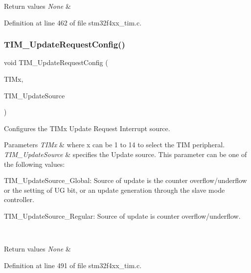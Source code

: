 \begin{DoxyRetVals}{Return values}
{\em None} & \\
\hline
\end{DoxyRetVals}


Definition at line 462 of file stm32f4xx\+\_\+tim.\+c.

\mbox{\label{group___t_i_m___group1_ga1d7a8f952e209de142499e67a653fc1f}} 
\subsubsection{\texorpdfstring{T\+I\+M\+\_\+\+Update\+Request\+Config()}{TIM\_UpdateRequestConfig()}}
{\footnotesize\ttfamily void T\+I\+M\+\_\+\+Update\+Request\+Config (\begin{DoxyParamCaption}\item[{\hyperlink{struct_t_i_m___type_def}{T\+I\+M\+\_\+\+Type\+Def} $\ast$}]{T\+I\+Mx,  }\item[{uint16\+\_\+t}]{T\+I\+M\+\_\+\+Update\+Source }\end{DoxyParamCaption})}



Configures the T\+I\+Mx Update Request Interrupt source. 


\begin{DoxyParams}{Parameters}
{\em T\+I\+Mx} & where x can be 1 to 14 to select the T\+IM peripheral. \\
\hline
{\em T\+I\+M\+\_\+\+Update\+Source} & specifies the Update source. This parameter can be one of the following values\+: \begin{DoxyItemize}
\item T\+I\+M\+\_\+\+Update\+Source\+\_\+\+Global\+: Source of update is the counter overflow/underflow or the setting of UG bit, or an update generation through the slave mode controller. \item T\+I\+M\+\_\+\+Update\+Source\+\_\+\+Regular\+: Source of update is counter overflow/underflow. \end{DoxyItemize}
\\
\hline
\end{DoxyParams}

\begin{DoxyRetVals}{Return values}
{\em None} & \\
\hline
\end{DoxyRetVals}


Definition at line 491 of file stm32f4xx\+\_\+tim.\+c.

